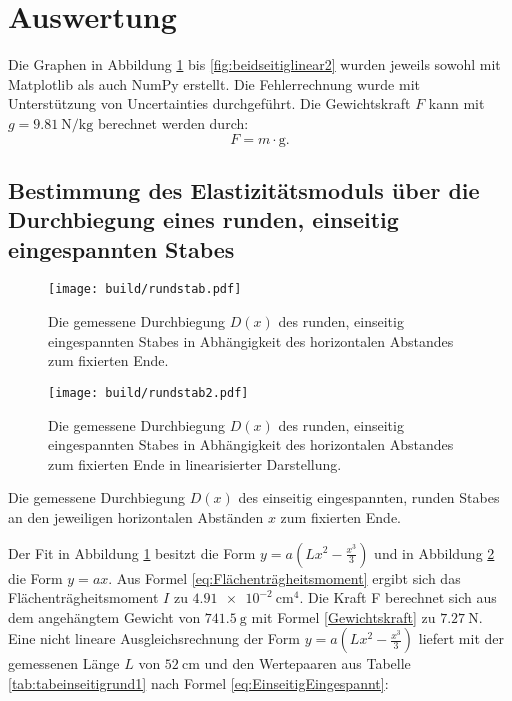 
\section{Auswertung}
\label{sec:Auswertung}
Die Graphen in Abbildung \ref{fig:rund} bis \ref{fig:beidseitiglinear2} wurden jeweils sowohl mit Matplotlib \cite{matplotlib} als auch NumPy \cite{numpy} erstellt. Die Fehlerrechnung wurde mit Unterstützung von Uncertainties \cite{uncertainties} durchgeführt. Die Gewichtskraft $F$ kann mit $g=\SI{9.81}{\newton\per\kilogram}$ berechnet werden durch:
\begin{displaymath}
	F = m \cdot \text{g.} \label{Gewichtskraft}
\end{displaymath}

\subsection{Bestimmung des Elastizitätsmoduls über die Durchbiegung eines runden, einseitig eingespannten Stabes}
\begin{figure}
	\centering
	\caption{Die gemessene Durchbiegung $D(x)$ des runden, einseitig eingespannten Stabes
	 in Abhängigkeit des horizontalen Abstandes zum fixierten Ende.}
	\texttt{[image: build/rundstab.pdf]}
	\label{fig:rund}
\end{figure}
\begin{figure}
	\centering
	\caption{Die gemessene Durchbiegung $D(x)$ des runden, einseitig eingespannten Stabes
	 in Abhängigkeit des horizontalen Abstandes zum fixierten Ende in linearisierter Darstellung.}
	\texttt{[image: build/rundstab2.pdf]}
	\label{fig:rundlinear}
\end{figure}
\begin{table}
	\caption{Die gemessene Durchbiegung $D(x)$ des einseitig eingespannten, runden Stabes an den jeweiligen horizontalen Abständen $x$ zum fixierten Ende.}
	\begin{minipage}{0.5\textwidth}
		\centering
		
	\end{minipage}
	\begin{minipage}{0.5\textwidth}
		\centering
		
	\end{minipage}
\end{table}
Der Fit in Abbildung \ref{fig:rund} besitzt die Form $y = a ( L x^2 - \frac{x^3}{3} ) $ und in Abbildung \ref{fig:rundlinear} die Form $y=a x$. Aus Formel \eqref{eq:Flächenträgheitsmoment} ergibt sich das Flächenträgheitsmoment $I$ zu $\SI{4.91e-2}{\centi\meter\tothe{4}}$. Die Kraft F berechnet sich aus dem angehängtem Gewicht von $\SI{741.5}{\gram}$ mit Formel \eqref{Gewichtskraft} zu $\SI{7.27}{\newton}$. Eine nicht lineare Ausgleichsrechnung der Form $y = a ( L x^2 - \frac{x^3}{3})$ liefert mit der gemessenen Länge $L$ von $\SI{52}{\centi\meter}$ und den Wertepaaren aus Tabelle \ref{tab:tabeinseitigrund1} nach Formel \eqref{eq:EinseitigEingespannt}:
